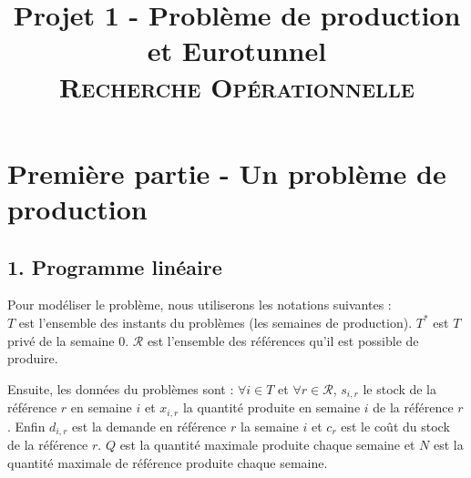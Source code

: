 \documentclass{rapport}
\title{Projet 1 - Problème de production et Eurotunnel \\ \textsc{Recherche Opérationnelle}}
\begin{document}
\maketitle

\section{Première partie - Un problème de production}

\subsection{1. Programme linéaire}

Pour modéliser le problème, nous utiliserons les notations suivantes :
\ \\
$T$ est l'ensemble des instants du problèmes (les semaines de production). $T^*$ est $T$ privé de la semaine $0$. $\mathcal{R}$ est l'ensemble des références qu'il est possible de produire.

Ensuite, les données du problèmes sont : $\forall i \in T$ et $\forall r \in \mathcal{R}$, $s_{i,r}$ le stock de la référence $r$ en semaine $i$ et $x_{i,r}$ la quantité produite en semaine $i$ de la référence $r$. Enfin $d_{i,r}$ est la demande en référence $r$ la semaine $i$ et $c_r$ est le coût du stock de la référence $r$. $Q$ est la quantité maximale produite chaque semaine et $N$ est la quantité maximale de référence produite chaque semaine.
\ \\
\end{document}
